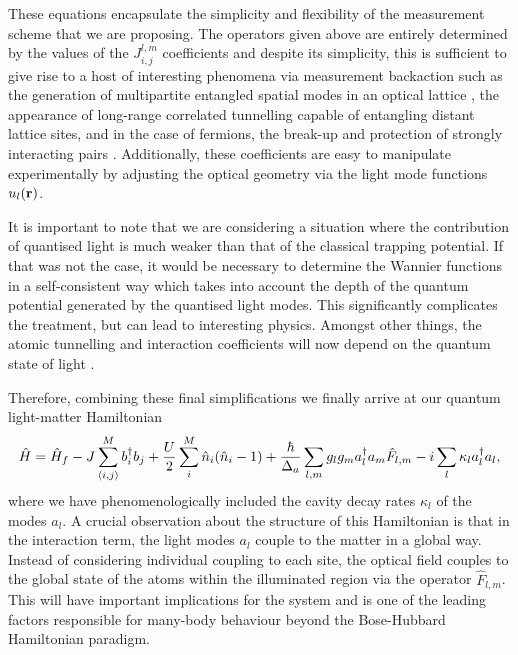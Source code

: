 These equations encapsulate the simplicity and flexibility of the
measurement scheme that we are proposing. The operators given above
are entirely determined by the values of the $J^{l,m}_{i,j}$
coefficients and despite its simplicity, this is sufficient to give
rise to a host of interesting phenomena via measurement backaction
such as the generation of multipartite entangled spatial modes in an
optical lattice \cite{mekhov2009pra, elliott2015, atoms2015}, the
appearance of long-range correlated tunnelling capable of entangling
distant lattice sites, and in the case of fermions, the break-up and
protection of strongly interacting pairs \cite{mazzucchi2016,
  kozlowski2016zeno}. Additionally, these coefficients are easy to
manipulate experimentally by adjusting the optical geometry via the
light mode functions $u_l(\mathbf{r})$.

It is important to note that we are considering a situation where the
contribution of quantised light is much weaker than that of the
classical trapping potential. If that was not the case, it would be
necessary to determine the Wannier functions in a self-consistent way
which takes into account the depth of the quantum potential generated
by the quantised light modes. This significantly complicates the
treatment, but can lead to interesting physics. Amongst other things,
the atomic tunnelling and interaction coefficients will now depend on
the quantum state of light \cite{mekhov2008}.  

Therefore, combining these final simplifications we finally arrive at
our quantum light-matter Hamiltonian
\begin{equation}
  \label{eq:fullH}
  \hat{H} = \hat{H}_f -J \sum_{\langle i,j \rangle}^M b^\dagger_i b_j + 
  \frac{U}{2} \sum_{i}^M \hat{n}_i (\hat{n}_i - 1) + 
  \frac{\hbar}{\Delta_a} \sum_{l,m} g_l g_m a^\dagger_l a_m \hat{F}_{l,m} -
  i \sum_l \kappa_l a^\dagger_l a_l,
\end{equation}
where we have phenomenologically included the cavity decay rates
$\kappa_l$ of the modes $a_l$. A crucial observation about the
structure of this Hamiltonian is that in the interaction term, the
light modes $a_l$ couple to the matter in a global way. Instead of
considering individual coupling to each site, the optical field
couples to the global state of the atoms within the illuminated region
via the operator $\hat{F}_{l,m}$. This will have important
implications for the system and is one of the leading factors
responsible for many-body behaviour beyond the Bose-Hubbard
Hamiltonian paradigm. 

